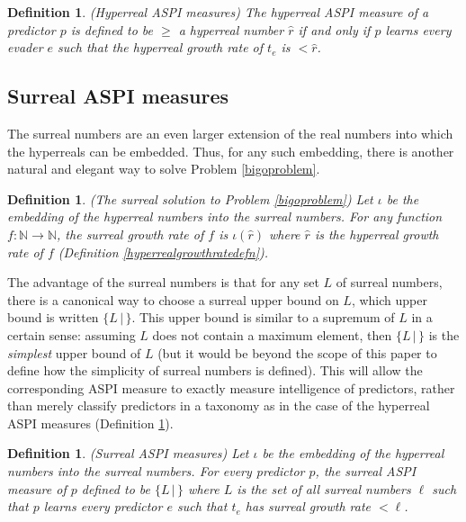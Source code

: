 \documentclass{article}
\newtheorem{definition}[theorem]{Definition}
\begin{document}
\begin{definition}
\label{hyperrealhibbardintelligencedefn}
    (Hyperreal ASPI measures)
    The \emph{hyperreal ASPI measure} of a predictor $p$ is defined to be
    $\geq$ a hyperreal number $\hat r$ if and only if $p$ learns every evader $e$
    such that the hyperreal growth rate of $t_e$ is $<\hat r$.
\end{definition}

\subsection{Surreal ASPI measures}

The surreal numbers \cite{conway} \cite{knuth} \cite{ehrlich2012absolute}
are an even larger extension
of the real numbers
into which the hyperreals can be embedded.
Thus, for any such embedding,
there is another natural and elegant way to solve Problem \ref{bigoproblem}.

\begin{definition}
    (The surreal solution to Problem \ref{bigoproblem})
    Let $\iota$ be the embedding of the hyperreal numbers into the surreal
    numbers.
    For any function $f:\mathbb N\to\mathbb N$, the \emph{surreal growth rate
    of $f$} is $\iota(\hat r)$ where $\hat r$ is the hyperreal growth
    rate of $f$ (Definition \ref{hyperrealgrowthratedefn}).
\end{definition}

The advantage of the surreal numbers is that for any set $L$ of surreal numbers,
there is a canonical way to choose a surreal upper bound on $L$,
which upper bound is written $\{L\,|\,\}$. This upper bound is similar to a
supremum of $L$ in a certain sense: assuming $L$ does not contain a maximum
element, then $\{L\,|\,\}$ is the \emph{simplest} upper bound of $L$ (but it
would be beyond the scope of this paper to define how the simplicity of surreal
numbers is defined). This will allow
the corresponding ASPI measure to exactly measure intelligence of predictors,
rather than merely classify predictors in a taxonomy as in the case of
the hyperreal ASPI measures (Definition \ref{hyperrealhibbardintelligencedefn}).

\begin{definition}
\label{surrealhibbardintelligencedefn}
    (Surreal ASPI measures)
    Let $\iota$ be the embedding of the hyperreal numbers into the surreal
    numbers.
    For every predictor $p$, the \emph{surreal ASPI measure} of $p$
    defined to be $\{L\,|\,\}$ where $L$ is the set of all surreal
    numbers $\ell$ such that $p$ learns every predictor $e$ such that
    $t_e$ has surreal growth rate $<\ell$.
\end{definition}
\end{document}
